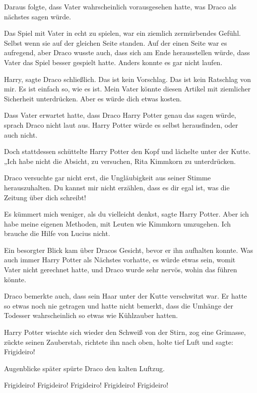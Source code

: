 Daraus folgte, dass Vater wahrscheinlich vorausgesehen hatte, was Draco als
nächstes sagen würde.

Das Spiel mit Vater in echt zu spielen, war ein ziemlich zermürbendes Gefühl.
Selbst wenn sie auf der gleichen Seite standen. Auf der einen Seite war es
aufregend, aber Draco wusste auch, dass sich am Ende herausstellen würde, dass
Vater das Spiel besser gespielt hatte. Anders konnte es gar nicht laufen.

\glqq{}Harry\grqq{}, sagte Draco schließlich. \glqq{}Das ist kein Vorschlag. Das
ist kein Ratschlag von mir. Es ist einfach so, wie es ist. Mein Vater könnte
diesen Artikel mit ziemlicher Sicherheit unterdrücken. Aber es würde dich etwas
kosten.\grqq{}

Dass Vater erwartet hatte, dass Draco Harry Potter genau das sagen würde, sprach
Draco nicht laut aus. Harry Potter würde es selbst herausfinden, oder auch
nicht.

Doch stattdessen schüttelte Harry Potter den Kopf und lächelte unter der Kutte.
„Ich habe nicht die Absicht, zu versuchen, Rita Kimmkorn zu unterdrücken.\grqq{}

Draco versuchte gar nicht erst, die Ungläubigkeit aus seiner Stimme
herauszuhalten. \glqq{}Du kannst mir nicht erzählen, dass es dir egal ist, was
die Zeitung über dich schreibt!\grqq{}

\glqq{}Es kümmert mich weniger, als du vielleicht denkst\grqq{}, sagte Harry
Potter. \glqq{}Aber ich habe meine eigenen Methoden, mit Leuten wie Kimmkorn
umzugehen. Ich brauche die Hilfe von Lucius nicht.\grqq{}

Ein besorgter Blick kam über Dracos Gesicht, bevor er ihn aufhalten konnte. Was
auch immer Harry Potter als Nächstes vorhatte, es würde etwas sein, womit Vater
nicht gerechnet hatte, und Draco wurde sehr nervös, wohin das führen könnte.

Draco bemerkte auch, dass sein Haar unter der Kutte verschwitzt war. Er hatte so
etwas noch nie getragen und hatte nicht bemerkt, dass die Umhänge der Todesser
wahrscheinlich so etwas wie Kühlzauber hatten.

Harry Potter wischte sich wieder den Schweiß von der Stirn, zog eine Grimasse,
zückte seinen Zauberstab, richtete ihn nach oben, holte tief Luft und sagte:
\glqq{}Frigideiro!\grqq{}

Augenblicke später spürte Draco den kalten Luftzug.

\glqq{}Frigideiro! Frigideiro! Frigideiro! Frigideiro! Frigideiro!\grqq{}

